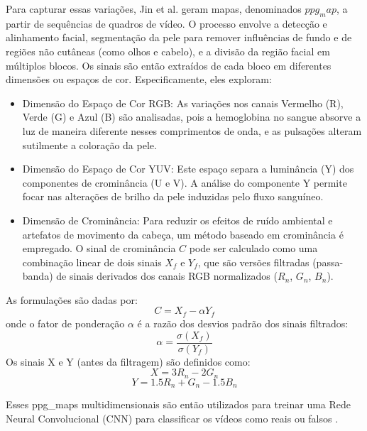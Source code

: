 Para capturar essas variações, Jin et al. \cite{jin2021analise} geram mapas, denominados $ppg_map$, a partir de sequências de quadros de vídeo. O processo envolve a detecção e alinhamento facial, segmentação da pele para remover influências de fundo e de regiões não cutâneas (como olhos e cabelo), e a divisão da região facial em múltiplos blocos. Os sinais são então extraídos de cada bloco em diferentes dimensões ou espaços de cor. Especificamente, eles exploram:
\begin{itemize}
    \item Dimensão do Espaço de Cor RGB: As variações nos canais Vermelho (R), Verde (G) e Azul (B) são analisadas, pois a hemoglobina no sangue absorve a luz de maneira diferente nesses comprimentos de onda, e as pulsações alteram sutilmente a coloração da pele.
    \item Dimensão do Espaço de Cor YUV: Este espaço separa a luminância (Y) dos componentes de crominância (U e V). A análise do componente Y permite focar nas alterações de brilho da pele induzidas pelo fluxo sanguíneo.
    \item Dimensão de Crominância: Para reduzir os efeitos de ruído ambiental e artefatos de movimento da cabeça, um método baseado em crominância é empregado. O sinal de crominância $C$ pode ser calculado como uma combinação linear de dois sinais $X_f$ e $Y_f$, que são versões filtradas (passa-banda) de sinais derivados dos canais RGB normalizados ($R_n$, $G_n$, $B_n$).
\end{itemize}

As formulações são dadas por: 
\begin{equation} C = X_f - \alpha Y_f \label{eq:chrominance_signal} \end{equation} 
onde o fator de ponderação $\alpha$ é a razão dos desvios padrão dos sinais filtrados: 
\begin{equation} \alpha = \frac{\sigma(X_f)}{\sigma(Y_f)} \label{eq:alpha_chrominance} \end{equation} Os sinais X e Y (antes da filtragem) são definidos como: \begin{equation} X = 3R_n - 2G_n \label{eq:X_chrominance} \end{equation} \begin{equation} Y = 1.5R_n + G_n - 1.5B_n \label{eq:Y_chrominance} \end{equation} 

Esses ppg_maps multidimensionais são então utilizados para treinar uma Rede Neural Convolucional (CNN) para classificar os vídeos como reais ou falsos \cite{jin2021analise}.

